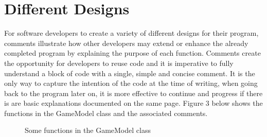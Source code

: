 \documentclass[12pt, a4]{report}
\begin{document}
	\section{Different Designs}
	\par For software developers to create a variety of different designs for their program, comments illustrate how other developers may extend or enhance the already completed program by explaining the purpose of each function. Comments create the opportunity for developers to reuse code and it is imperative to fully understand a block of code with a single, simple and concise comment. It is the only way to capture the intention of the code at the time of writing, when going back to the program later on, it is more effective to continue and progress if there is are basic explanations documented on the same page. Figure 3 below shows the functions in the GameModel class and the associated comments.
	
	\begin{figure}[h]
		
		\caption{Some functions in the GameModel class}
	\end{figure}
	
	
	
\end{document}
